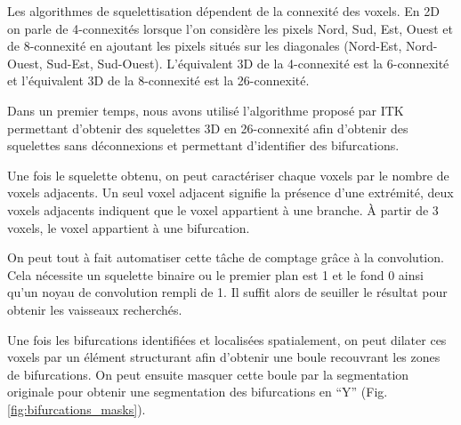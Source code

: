 Les algorithmes de squelettisation dépendent de la connexité des voxels. En 2D on parle de 4-connexités lorsque l'on considère les pixels Nord, Sud, Est, Ouest et de 8-connexité en ajoutant les pixels situés sur les diagonales (Nord-Est, Nord-Ouest, Sud-Est, Sud-Ouest). L'équivalent 3D de la 4-connexité est la 6-connexité et l'équivalent 3D de la 8-connexité est la 26-connexité.

Dans un premier temps, nous avons utilisé l'algorithme proposé par ITK permettant d'obtenir des squelettes 3D \cite{Homann2007_implementation_thinning} en 26-connexité afin d'obtenir des squelettes sans déconnexions et permettant d'identifier des bifurcations. 

Une fois le squelette obtenu, on peut caractériser chaque voxels par le nombre de voxels adjacents. Un seul voxel adjacent signifie la présence d'une extrémité, deux voxels adjacents indiquent que le voxel appartient à une branche. À partir de 3 voxels, le voxel appartient à une bifurcation.

On peut tout à fait automatiser cette tâche de comptage grâce à la convolution. Cela nécessite un squelette binaire ou le premier plan est 1 et le  fond 0 ainsi qu'un noyau de convolution rempli de 1. Il suffit alors de seuiller le résultat pour obtenir les vaisseaux recherchés.

Une fois les bifurcations identifiées et localisées spatialement, on peut dilater ces voxels par un élément structurant afin d'obtenir une boule recouvrant les zones de bifurcations. On peut ensuite masquer cette boule par la segmentation originale pour obtenir une segmentation des bifurcations en ``Y'' (Fig. \ref{fig:bifurcations_masks}).

